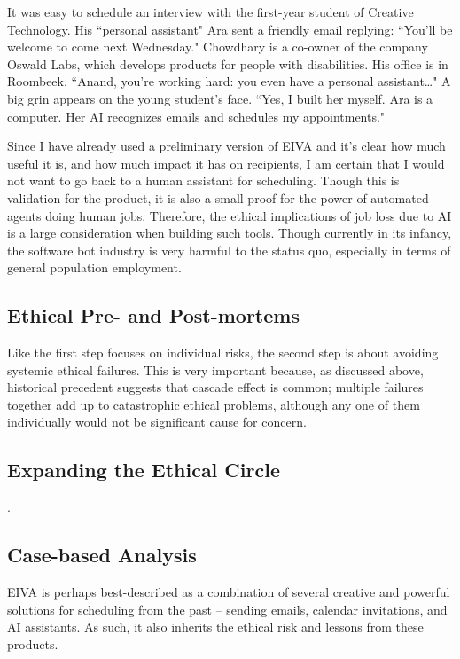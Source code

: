 \documentclass{article}
\begin{document}
\begin{displayquote}
It was easy to schedule an interview with the first-year student of Creative Technology. His ``personal assistant" Ara sent a friendly email replying: ``You’ll be welcome to come next Wednesday." Chowdhary is a co-owner of the company Oswald Labs, which develops products for people with disabilities. His office is in Roombeek. ``Anand, you’re working hard: you even have a personal assistant…" A big grin appears on the young student’s face. ``Yes, I built her myself. Ara is a computer. Her AI recognizes emails and schedules my appointments."
\end{displayquote}

Since I have already used a preliminary version of EIVA and it's clear how much useful it is, and how much impact it has on recipients, I am certain that I would not want to go back to a human assistant for scheduling. Though this is validation for the product, it is also a small proof for the power of automated agents doing human jobs. Therefore, the ethical implications of job loss due to AI is a large consideration when building such tools. Though currently in its infancy, the software bot industry is very harmful to the status quo, especially in terms of general population employment.

\subsection{Ethical Pre- and Post-mortems}

Like the first step focuses on individual risks, the second step is about avoiding systemic ethical failures. This is very important because, as discussed above, historical precedent suggests that cascade effect is common; multiple failures together add up to catastrophic ethical problems, although any one of them individually would not be significant cause for concern.



\subsection{Expanding the Ethical Circle}

.

\subsection{Case-based Analysis}

EIVA is perhaps best-described as a combination of several creative and powerful solutions for scheduling from the past -- sending emails, calendar invitations, and AI assistants. As such, it also inherits the ethical risk and lessons from these products.
\end{document}

